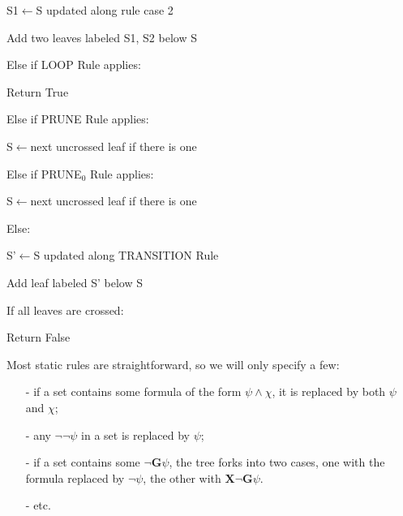 \documentclass[11pt]{article}
\newcommand{\X}{{\mathbf{X}}}
\newcommand{\andd}{{\wedge}}
\newcommand{\G}{{\mathbf{G}}}
\theoremstyle{definition}
\begin{document}
{\hspace*{1cm}\hspace*{1cm}        S1$\gets$S updated along rule case 2
        
\hspace*{1cm}\hspace*{1cm}        Add two leaves labeled S1, S2 below S

\hspace*{1cm}    Else if LOOP Rule applies:

\hspace*{1cm}\hspace*{1cm}      Return True

\hspace*{1cm}   Else if PRUNE Rule applies:

\hspace*{1cm}\hspace*{1cm}      S$\gets$next uncrossed leaf if there is one

\hspace*{1cm}   Else if {PRUNE}$_0$ Rule applies:

\hspace*{1cm}\hspace*{1cm}       S$\gets$next uncrossed leaf if there is one

\hspace*{1cm}   Else:

\hspace*{1cm}\hspace*{1cm}      S'$\gets$S updated along TRANSITION Rule

\hspace*{1cm}\hspace*{1cm}      Add leaf labeled S' below S

\hspace*{1cm}    If all leaves are crossed:

\hspace*{1cm}\hspace*{1cm}       Return False \newline

}

Most static rules are straightforward, so we will only specify a few: 
\begin{itemize}
    \item [-] if a set contains some formula of the form $\psi\andd\chi$, it is replaced by both $\psi$ and $\chi$;
    \item [-] any $\neg\neg\psi$ in a set is replaced by $\psi$;
    \item [-] if a set contains some $\neg\G\psi$, the tree forks into two cases, one with the formula replaced by $\neg\psi$, the
    other with $\X\neg\G\psi$.
    \item [-] etc.
\end{itemize}
\end{document}
